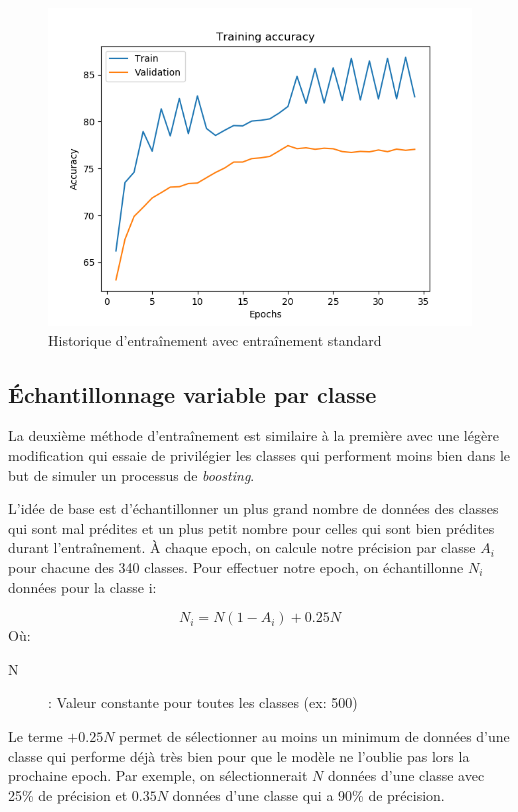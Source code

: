 \begin{figure}[h]
	\includegraphics[width=\linewidth]{images/Model_general.png} %
	\caption{Historique d'entraînement avec entraînement standard} %
	\label{histmodelnormal} 
\end{figure}


\subsection{Échantillonnage variable par classe}
La deuxième méthode d'entraînement est similaire à la première avec une légère modification qui essaie de privilégier les classes qui performent moins bien dans le but de simuler un processus de \emph{boosting}.


L'idée de base est d'échantillonner un plus grand nombre de données des classes qui sont mal prédites et un plus petit nombre pour celles qui sont bien prédites durant l'entraînement. 
À chaque epoch, on calcule notre précision par classe $A_i$ pour chacune des 340 classes. 
Pour effectuer notre epoch, on échantillonne $N_i$ données pour la classe i:

$$N_i=N(1-A_i)+0.25N$$
Où:
\begin{description}
\item[N]: Valeur constante pour toutes les classes (ex: 500)
\end{description}

Le terme $+0.25N$ permet de sélectionner au moins un minimum de données d'une classe qui performe déjà très bien pour que le modèle ne l'oublie pas lors la prochaine epoch.  Par exemple, on sélectionnerait $N$ données d'une classe avec 25\% de précision et $0.35N$ données d'une classe qui a 90\% de précision.


